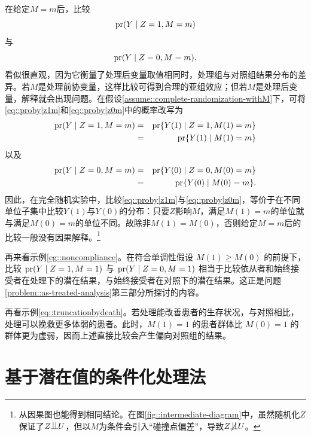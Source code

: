  
在给定$M= m$后，比较
\begin{equation}
\textup{pr}(Y\mid Z=1, M=m)\label{eq::proby|z1m}
\end{equation}
与
\begin{equation}
\textup{pr}(Y\mid Z=0, M=m).\label{eq::proby|z0m}
\end{equation}
看似很直观，因为它衡量了处理后变量取值相同时，处理组与对照组结果分布的差异。若$M$是处理前协变量，这样比较可得到合理的亚组效应；但若$M$是处理后变量，解释就会出现问题。在假设\ref{assume::complete-randomization-withM}下，可将\eqref{eq::proby|z1m}和\eqref{eq::proby|z0m}中的概率改写为
\begin{eqnarray*}
\textup{pr}(Y\mid Z=1, M=m)  &=& \textup{pr}\{ Y(1)\mid Z=1, M(1) = m  \} \\
&=& \textup{pr}\{ Y(1)\mid   M(1) = m  \}
\end{eqnarray*}
以及
\begin{eqnarray*}
\textup{pr}(Y\mid Z=0, M=m) &=&  \textup{pr}\{ Y(0)\mid Z=0, M(0) = m  \} \\
&=& \textup{pr}\{ Y(0)\mid   M(0) = m  \} . 
\end{eqnarray*}
因此，在完全随机实验中，比较\eqref{eq::proby|z1m}与\eqref{eq::proby|z0m}，等价于在不同单位子集中比较$Y(1)$与$Y(0)$的分布：只要$Z$影响$M$，满足$M(1) = m$的单位就与满足$M(0) = m$的单位不同。故除非$M(1) = M(0)$，否则给定$M=m$后的比较一般没有因果解释。\footnote{从因果图也能得到相同结论。在图\ref{fig::intermediate-diagram}中，虽然随机化$Z$保证了$Z\ind U$，但以$M$为条件会引入“碰撞点偏差”，导致$Z\nind U$。} 


再来看示例\ref{eg::noncompliance}。在符合单调性假设 $M(1) \geq M(0)$ 的前提下，比较 $\textup{pr}(Y\mid Z=1, M=1)$ 与 $\textup{pr}(Y\mid Z=0, M=1)$ 相当于比较依从者和始终接受者在处理下的潜在结果，与始终接受者在对照下的潜在结果。这正是问题\ref{problem::as-treated-analysis}第三部分所探讨的内容。


再看示例\ref{eq::truncationbydeath}。若处理能改善患者的生存状况，与对照相比，处理可以挽救更多体弱的患者。此时，$M(1)=1$ 的患者群体比 $M(0)=1$ 的群体更为虚弱，因而上述直接比较会产生偏向对照组的结果。

\section{基于潜在值的条件化处理法}


